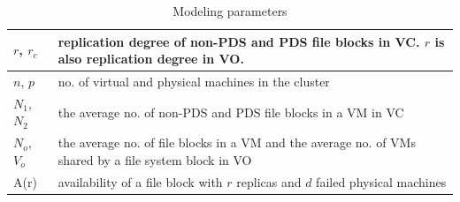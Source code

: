 \begin{table}[htbp]
\centering
\begin{tabular}{|p{1.0cm}|p{5.75cm}|}
\hline
$r$, $r_c$ & replication degree of non-PDS and PDS file blocks in VC. $r$ is also replication degree in VO.\\
\hline
$n$, $p$ & no. of virtual and physical machines in the cluster\\
\hline
$N_1$, $N_2$ & the average no.  of non-PDS and PDS file blocks in a VM in VC\\
\hline
$N_o$, $V_o$ & the average no.  of file blocks  in a VM and the average no. of VMs shared by a file system block in VO\\
\hline
A(r) & availability of a file block with $r$ replicas and $d$ failed physical machines\\
\hline
\end{tabular}
\caption{Modeling  parameters}
\label{tab:symbol}
\end{table}



